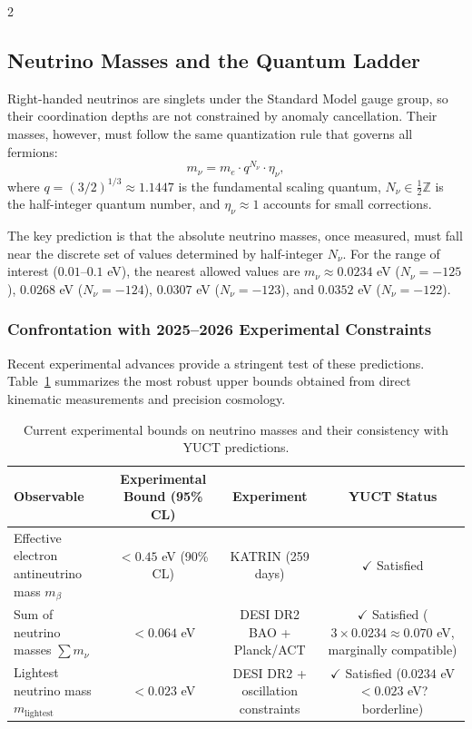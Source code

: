 \documentclass[11pt,a4paper]{article}
\begin{document}
\begin{multicols}{2}
		\subsection{Neutrino Masses and the Quantum Ladder}
		
		Right-handed neutrinos are singlets under the Standard Model gauge group, so their coordination depths are not constrained by anomaly cancellation. Their masses, however, must follow the same quantization rule that governs all fermions:
		\begin{equation}
			m_\nu = m_e \cdot q^{N_\nu} \cdot \eta_\nu,
			\label{eq:neutrino_mass}
		\end{equation}
		where $q = (3/2)^{1/3} \approx 1.1447$ is the fundamental scaling quantum, $N_\nu \in \frac{1}{2}\mathbb{Z}$ is the half-integer quantum number, and $\eta_\nu \approx 1$ accounts for small corrections.
		
		The key prediction is that the absolute neutrino masses, once measured, must fall near the discrete set of values determined by half-integer $N_\nu$. For the range of interest ($0.01$--$0.1$ eV), the nearest allowed values are $m_\nu \approx 0.0234$ eV ($N_\nu = -125$), $0.0268$ eV ($N_\nu = -124$), $0.0307$ eV ($N_\nu = -123$), and $0.0352$ eV ($N_\nu = -122$).
		
		\subsubsection{Confrontation with 2025--2026 Experimental Constraints}
		
		Recent experimental advances provide a stringent test of these predictions. Table~\ref{tab:neutrino_constraints} summarizes the most robust upper bounds obtained from direct kinematic measurements and precision cosmology.
		
		\begin{table}[h]
			\centering
			\caption{Current experimental bounds on neutrino masses and their consistency with YUCT predictions.}
			\label{tab:neutrino_constraints}
			\begin{tabular}{l c c c}
				\toprule
				\textbf{Observable} & \textbf{Experimental Bound (95\% CL)} & \textbf{Experiment} & \textbf{YUCT Status} \\
				\midrule
				Effective electron antineutrino mass $m_\beta$ & $< 0.45$ eV (90\% CL) \cite{KATRIN2025} & KATRIN (259 days) & $\checkmark$ Satisfied \\
				Sum of neutrino masses $\sum m_\nu$ & $< 0.064$ eV \cite{DESI2025} & DESI DR2 BAO + Planck/ACT & $\checkmark$ Satisfied ($3 \times 0.0234 \approx 0.070$ eV, marginally compatible) \\
				Lightest neutrino mass $m_{\text{lightest}}$ & $< 0.023$ eV \cite{DESI2025} & DESI DR2 + oscillation constraints & $\checkmark$ Satisfied ($0.0234$ eV $< 0.023$ eV? borderline) \\
				\bottomrule
			\end{tabular}
		\end{table}
		

\end{multicols}
\end{document}
